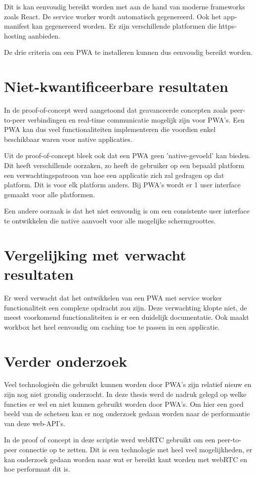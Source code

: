 		Dit is kan eenvoudig bereikt worden met aan de hand van moderne frameworks zoals React. De service worker wordt automatisch gegenereerd. Ook het app-manifest kan gegenereerd worden. Er zijn verschillende platformen die https-hosting aanbieden. 
		
		De drie criteria om een PWA te installeren kunnen dus eenvoudig bereikt worden.
	
\section{Niet-kwantificeerbare resultaten}
	In de proof-of-concept werd aangetoond dat geavanceerde concepten zoals peer-to-peer verbindingen en real-time communicatie mogelijk zijn voor PWA's. Een PWA kan dus veel functionaliteiten implementeren die voordien enkel beschikbaar waren voor native applicaties.
	
	Uit de proof-of-concept bleek ook dat een PWA geen 'native-gevoeld' kan bieden. 
	Dit heeft verschillende oorzaken, zo heeft de gebruiker op een bepaald platform een verwachtingspatroon van hoe een applicatie zich zal gedragen op dat platform. Dit is voor elk platform anders. Bij PWA's wordt er 1 user interface gemaakt voor alle platformen.
	
	Een andere oorzaak is dat het niet eenvoudig is om een consistente user interface te ontwikkelen die native aanvoelt voor alle mogelijke schermgroottes.
	
\section{Vergelijking met verwacht resultaten}
	Er werd verwacht dat het ontwikkelen van een PWA met service worker functionaliteit een complexe opdracht zou zijn.
	Deze verwachting klopte niet, de meest voorkomend functionaliteiten is er een duidelijk documentatie. Ook maakt workbox het heel eenvoudig om caching toe te passen in een applicatie.
	

\section{Verder onderzoek}
	Veel technologieën die gebruikt kunnen worden door PWA's zijn relatief nieuw en zijn nog niet grondig onderzocht.
	In deze thesis werd de nadruk gelegd op welke functies er wel en niet kunnen gebruikt worden door PWA's. Om hier een goed beeld van de schetsen kan er nog onderzoek gedaan worden naar de performantie van deze web-API's.
	
	In de proof of concept in deze scriptie werd webRTC gebruikt om een peer-to-peer connectie op te zetten. Dit is een technologie met heel veel mogelijkheden, er kan onderzoek gedaan worden naar wat er bereikt kant worden met webRTC en hoe performant dit is.